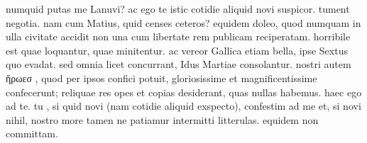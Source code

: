 


 numquid putas me Lanuvi? ac ego te istic cotidie aliquid novi suspicor. tument negotia. nam cum Matius, quid censes ceteros? equidem doleo, quod numquam in ulla civitate accidit non una cum libertate rem publicam reciperatam. horribile est quae loquantur, quae minitentur. ac vereor Gallica etiam bella, ipse Sextus quo evadat. sed omnia licet concurrant, Idus Martiae consolantur. nostri autem ἥρωεσ , quod per ipsos confici potuit, gloriosissime et magnificentissime confecerunt; reliquae res opes et copias desiderant, quas nullas habemus. haec ego ad te. tu , si quid novi (nam cotidie aliquid exspecto), confestim ad me et, si novi nihil, nostro more tamen ne patiamur intermitti litterulas. equidem non committam.
